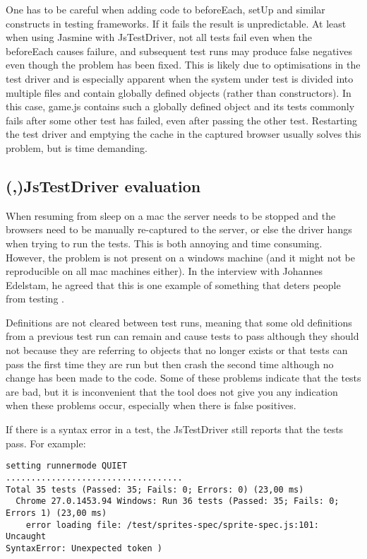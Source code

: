 \documentclass[11pt]{article}
\begin{document}
One has to be careful when adding code to beforeEach, setUp and similar constructs in testing frameworks. If it fails the result is unpredictable. At least when using Jasmine with JsTestDriver, not all tests fail even when the beforeEach causes failure, and subsequent test runs may produce false negatives even though the problem has been fixed. This is likely due to optimisations in the test driver and is especially apparent when the system under test is divided into multiple files and contain globally defined objects (rather than constructors). In this case, game.js contains such a globally defined object and its tests commonly fails after some other test has failed, even after passing the other test. Restarting the test driver and emptying the cache in the captured browser usually solves this problem, but is time demanding.

\subsection{(,)JsTestDriver evaluation}
\label{subsec:jstestdriver}

When resuming from sleep on a mac the server needs to be stopped and the browsers need to be manually re-captured to the server, or else the driver hangs when trying to run the tests. This is both annoying and time consuming. However, the problem is not present on a windows machine (and it might not be reproducible on all mac machines either). In the interview with Johannes Edelstam, he agreed that this is one example of something that deters people from testing \cite{Edelstam}.

Definitions are not cleared between test runs, meaning that some old definitions from a previous test run can remain and cause tests to pass although they should not because they are referring to objects that no longer exists or that tests can pass the first time they are run but then crash the second time although no change has been made to the code. Some of these problems indicate that the tests are bad, but it is inconvenient that the tool does not give you any indication when these problems occur, especially when there is false positives.

If there is a syntax error in a test, the JsTestDriver still reports that the tests pass. For example:

\begin{verbatim}
setting runnermode QUIET
...................................
Total 35 tests (Passed: 35; Fails: 0; Errors: 0) (23,00 ms)
  Chrome 27.0.1453.94 Windows: Run 36 tests (Passed: 35; Fails: 0;
Errors 1) (23,00 ms)
    error loading file: /test/sprites-spec/sprite-spec.js:101: Uncaught
SyntaxError: Unexpected token )
\end{verbatim}
\end{document}
